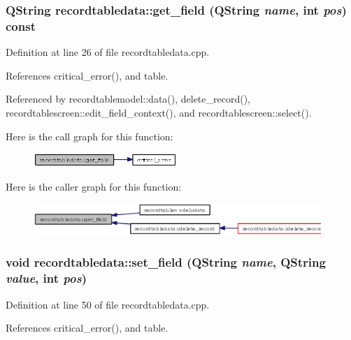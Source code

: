 \subsubsection{\setlength{\rightskip}{0pt plus 5cm}QString recordtabledata::get\_\-field (QString {\em name}, int {\em pos}) const}\label{classrecordtabledata_1e5d2effed44a3b5c2072f570cf02594}




Definition at line 26 of file recordtabledata.cpp.

References critical\_\-error(), and table.

Referenced by recordtablemodel::data(), delete\_\-record(), recordtablescreen::edit\_\-field\_\-context(), and recordtablescreen::select().

Here is the call graph for this function:\begin{figure}[H]
\begin{center}
\leavevmode
\includegraphics[width=154pt]{classrecordtabledata_1e5d2effed44a3b5c2072f570cf02594_cgraph}
\end{center}
\end{figure}


Here is the caller graph for this function:\begin{figure}[H]
\begin{center}
\leavevmode
\includegraphics[width=308pt]{classrecordtabledata_1e5d2effed44a3b5c2072f570cf02594_icgraph}
\end{center}
\end{figure}
\subsubsection{\setlength{\rightskip}{0pt plus 5cm}void recordtabledata::set\_\-field (QString {\em name}, QString {\em value}, int {\em pos})}\label{classrecordtabledata_700883543df1f758a8d9b6ceb69a98be}




Definition at line 50 of file recordtabledata.cpp.

References critical\_\-error(), and table.

